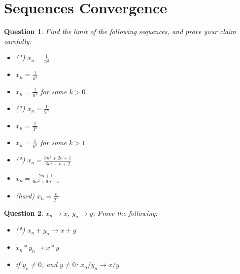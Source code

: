 \documentclass[]{article}
\newtheorem{question}{Question}
\begin{document}
\section{Sequences Convergence}
\begin{question}
	Find the limit of the following sequences, and prove your claim carefully:
	\begin{itemize}
		\item (*) $x_n=\frac{1}{n^2}$
		\item $x_n=\frac{1}{n^3}$
		\item $x_n=\frac{1}{n^k}$ for some $k>0$
		\item (*) $x_n=\frac{1}{2^n}$
		\item $x_n=\frac{1}{3^n}$
		\item $x_n=\frac{1}{k^n}$ for some $k>1$
		\item (*) $x_n=\frac{3n^2+2n+1}{6n^2-n+2}$
		\item $x_n=\frac{2n+1}{6n^2+9n-5}$
		\item (hard) $x_n=\frac{n}{2^n}$
	\end{itemize}
\end{question}

\begin{question}
	$x_n  \to x$, $y_n \to y$;
	Prove the following:
	\begin{itemize}
		\item (*) $x_n+y_n \to x+y$
		\item $x_n*y_n \to x*y$
		\item if $y_n \neq 0$, and $y \neq 0$: $x_n/y_n \to x/y$
	\end{itemize}
\end{question}
\end{document}
